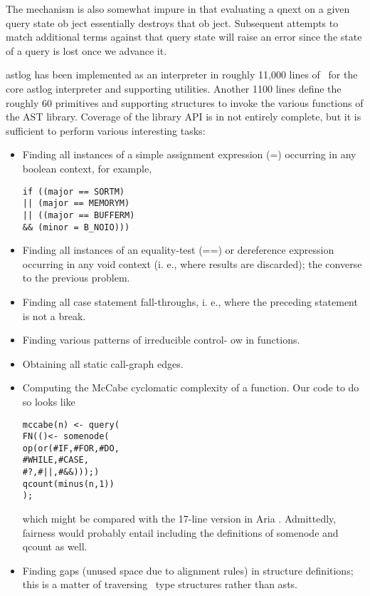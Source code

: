 The mechanism is also somewhat impure in that
evaluating a qnext on a given query state ob ject essentially
destroys that ob ject. Subsequent attempts to
match additional terms against that query state will
raise an error since the state of a query is lost once we
advance it.

\secup %


astlog has been implemented as an interpreter in roughly 11,000 lines of \cpp\
for the core astlog interpreter and supporting utilities. Another 1100 lines
define the roughly 60 primitives and supporting structures to invoke the various
functions of the AST library. Coverage of the library API is in not entirely
complete, but it is sufficient to perform various interesting tasks:

\begin{itemize}
  \item 
Finding all instances of a simple assignment expression (=) occurring in any
boolean context, for example,
\begin{verbatim}
if ((major == SORTM)
|| (major == MEMORYM)
|| ((major == BUFFERM)
&& (minor = B_NOIO)))
\end{verbatim}
  \item 
Finding all instances of an equality-test (==) or dereference expression
occurring in any void context (i. e., where results are discarded); the converse
to the previous problem.
  \item 
Finding all case statement fall-throughs, i. e.,
where the preceding statement is not a break. 
  \item 
Finding various patterns of irreducible control-
ow in functions. 
  \item 
Obtaining all static call-graph edges. 
  \item 
Computing the McCabe cyclomatic complexity \cite{McC76} of a function. Our code
to do so looks like
\begin{verbatim}
mccabe(n) <- query(
FN(()<- somenode(
op(or(#IF,#FOR,#DO,
#WHILE,#CASE,
#?,#||,#&&)));)
qcount(minus(n,1))
);
\end{verbatim}
which might be compared with the 17-line version in Aria \cite{DR96}.
Admittedly, fairness would probably entail including the definitions of somenode
and qcount as well.
  \item 
Finding gaps (unused space due to alignment rules) in structure definitions;
this is a matter of traversing \ci\ type structures rather than asts.
\end{itemize}

